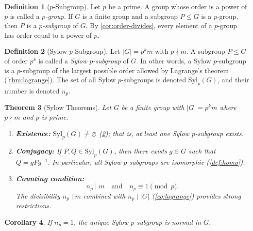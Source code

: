 \documentclass[12pt,a4paper]{article}
\theoremstyle{definition}
\newtheorem{definition}{Definition}[section]
\theoremstyle{plain}
\newtheorem{theorem}[definition]{Theorem}
\newtheorem{corollary}[definition]{Corollary}
\theoremstyle{remark}
\begin{document}
\begin{definition}[$p$-Subgroup]\label{def:p-subgroup}
Let $p$ be a prime. A group whose order is a power of $p$ is
called a \emph{$p$-group}. If $G$ is a finite group and a subgroup $P \leq G$
is a $p$-group, then $P$ is a \emph{$p$-subgroup} of $G$.
By \cref{cor:order-divides}, every element of a $p$-group has order equal to a power of $p$.
\end{definition}

\begin{definition}[Sylow $p$-Subgroup]\label{def:sylow}
Let $|G| = p^k m$ with $p \nmid m$. A subgroup $P \leq G$
of order $p^k$ is called a \emph{Sylow $p$-subgroup} of $G$. In other words,
a Sylow $p$-subgroup is a $p$-subgroup of the largest
possible order allowed by Lagrange's theorem (\cref{thm:lagrange}).
The set of all Sylow $p$-subgroups is denoted $\text{Syl}_p(G)$,
and their number is denoted $n_p$.
\end{definition}

\begin{theorem}[Sylow Theorems]\label{thm:sylow-thm}
Let $G$ be a finite group with $|G| = p^k m$ where
$p \nmid m$ and $p$ is prime.
\begin{enumerate}
    \item \textbf{Existence:} $\text{Syl}_p(G) \neq \varnothing$
          (\cref{def:sylow}); that is, at least one Sylow $p$-subgroup
          exists. \label{item:sylow-existence}
    \item \textbf{Conjugacy:} If $P, Q \in \text{Syl}_p(G)$, then there exists
          $g \in G$ such that $Q = gPg^{-1}$. In particular, all Sylow
          $p$-subgroups are isomorphic (\cref{def:homo}).
          \label{item:sylow-conjugacy}
    \item \textbf{Counting condition:}
          \begin{equation}\label{eq:sylow-count}
              n_p \mid m \quad \text{and} \quad n_p \equiv 1 \pmod{p}.
          \end{equation}
          The divisibility $n_p \mid m$ combined with $n_p \mid |G|$
          (\cref{eq:lagrange}) provides strong restrictions.
          \label{item:sylow-count}
\end{enumerate}
\end{theorem}

\begin{corollary}\label{cor:sylow-normal}
If $n_p = 1$, the unique Sylow $p$-subgroup is normal in $G$.
\end{corollary}
\end{document}
